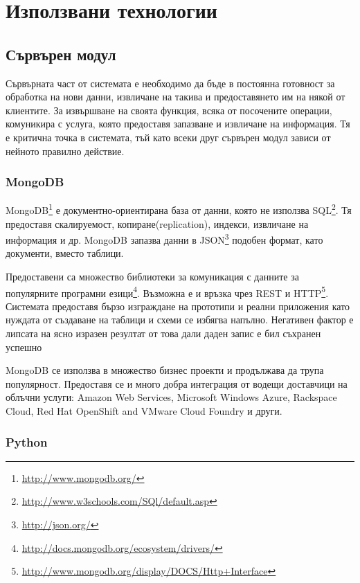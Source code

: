 \section{Използвани технологии}
	\subsection{Сървърен модул}
		
		Сървърната част от системата е необходимо да бъде в постоянна готовност за обработка на нови данни, извличане на такива и предоставянето им
		на някой от клиентите. За извършване на своята функция, всяка от посочените операции, комуникира с услуга, която предоставя запазване и извличане на информация. Тя е критична точка в системата, тъй като всеки друг сървърен модул зависи от нейното правилно действие.
	
		\subsubsection{MongoDB}
		
			MongoDB\footnote{\url{http://www.mongodb.org/}}	е документно-ориентирана база от данни, която не използва SQL\footnote{\url{http://www.w3schools.com/SQl/default.asp}}. Тя предоставя скалируемост, копиране(replication), индекси, извличане на информация и др.
			MongoDB запазва данни в JSON\footnote{\url{http://json.org/}} подобен формат, като документи, вместо таблици.
			
			Предоставени са множество библиотеки за комуникация с данните за популярните програмни езици\footnote{\url{http://docs.mongodb.org/ecosystem/drivers/}}. Възможна е и връзка чрез REST и HTTP\footnote{\url{http://www.mongodb.org/display/DOCS/Http+Interface}}.
			Системата предоставя бързо изграждане на прототипи и реални приложения като нуждата от създаване на таблици и схеми се избягва напълно.
			Негативен фактор е липсата на ясно изразен резултат от това дали даден запис е бил съхранен успешно\cite{Sirer}
			
			MongoDB се използва в множество бизнес проекти и продължава да трупа популярност. Предоставя се и много добра интеграция от водещи доставчици на облъчни услуги: Amazon Web Services, Microsoft Windows Azure, Rackspace Cloud, Red Hat OpenShift and VMware Cloud Foundry и други\cite{Marketwire}.
		
		\subsubsection{Python}
